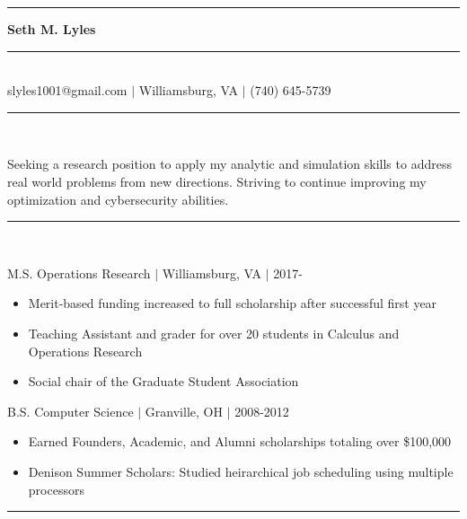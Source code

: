 \documentclass[11pt]{article}
\begin{document}
\begin{center}
\noindent\rule[5pt]{173pt}{.4pt}\LARGE\bf{ Seth M. Lyles }\rule[5pt]{173pt}{.4pt}\\ %
{\large slyles1001@gmail.com $|$ Williamsburg, VA $|$ (740) 645-5739}
\end{center}
\vspace{8pt}
\hrule\vspace{10pt}
\\
\vspace{-8pt}

\noindent Seeking a research position to apply my analytic and simulation skills to address real world problems from new directions. Striving to continue improving my optimization and cybersecurity abilities.

\vspace{8pt}\hrule\vspace{10pt}
\\
\vspace{-8pt}

\hfill {M.S. Operations Research $|$ Williamsburg, VA $|$ 2017-}

\begin{itemize}
\item Merit-based funding increased to full scholarship after successful first year
\item Teaching Assistant and grader for over 20 students in Calculus and Operations Research
\item Social chair of the Graduate Student Association
\end{itemize}

\hfill { B.S. Computer Science $|$ Granville, OH $|$ 2008-2012}

\begin{itemize}
\item Earned Founders, Academic, and Alumni scholarships totaling over \$100,000
\item Denison Summer Scholars: Studied heirarchical job scheduling using multiple processors
\end{itemize}

\vspace{8pt}\hrule\vspace{10pt}
\\
\vspace{-8pt}
\end{document}
